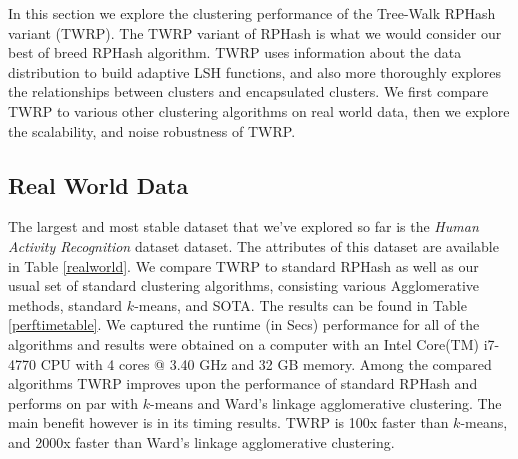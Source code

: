 In this section we explore the clustering performance of the Tree-Walk RPHash variant (\textsf{TWRP}).  The
\textsf{TWRP} variant of \textsf{RPHash} is what we would consider our best of breed \textsf{RPHash} algorithm.  \textsf{TWRP} uses
information about the data distribution to build adaptive LSH functions, and also more thoroughly
explores the relationships between clusters and encapsulated clusters.  We first compare \textsf{TWRP} to
various other clustering algorithms on real world data, then we explore the scalability, and noise
robustness of \textsf{TWRP}.

\subsection{Real World Data} 
	
The largest and most stable dataset that we've explored so far is the \emph{Human Activity Recognition} dataset \cite{har} dataset.  
The attributes of this dataset are available in Table
\ref{realworld}.  We compare \textsf{TWRP} to standard \textsf{RPHash} as well as our usual set of standard clustering
algorithms, consisting various Agglomerative methods, standard $k$-means, and SOTA.  The results can
be found in Table \ref{perftimetable}.  We captured the runtime (in Secs) performance for all of the
algorithms and results were obtained on a computer with an Intel Core(TM) i7-4770 CPU with 4 cores @
3.40 GHz and 32 GB memory.  Among the compared algorithms \textsf{TWRP} improves upon the performance of standard
\textsf{RPHash} and performs on par with $k$-means and Ward's linkage agglomerative clustering.  The main
benefit however is in its timing results. \textsf{TWRP} is 100x faster than $k$-means, and 2000x faster
than Ward's linkage agglomerative clustering.

